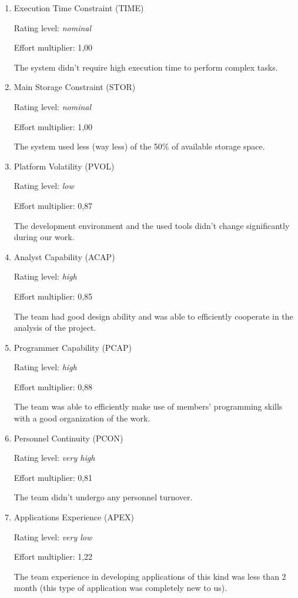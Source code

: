 \documentclass[10pt,a4paper,titlepage]{article}
\begin{document}
\begin{enumerate}
\item Execution Time Constraint (TIME)  

Rating level: \textit{nominal}

Effort multiplier: 1,00 
 
The system didn't require high execution time to perform complex tasks. 
 
\item Main Storage Constraint (STOR) 

Rating level: \textit{nominal}

Effort multiplier: 1,00 
 
The system used less (way less) of the 50\% of available storage space. 
 
\item Platform Volatility (PVOL)

Rating level: \textit{low}

Effort multiplier: 0,87 
 
The development environment and the used tools didn’t change significantly 
during our work. 
 
\item Analyst Capability (ACAP) 

Rating level: \textit{high}

Effort multiplier: 0,85 
 
The team had good design ability and was able to efficiently cooperate in the analysis of the project. 
 
\item Programmer Capability (PCAP) 

Rating level: \textit{high}

Effort multiplier: 0,88 
 
The team was able to efficiently make use of members' programming skills with a good organization of the work. 

\item Personnel Continuity (PCON) 

Rating level: \textit{very high}

Effort multiplier: 0,81 
 
The team didn't undergo any personnel turnover. 
 
\item Applications Experience (APEX) 

Rating level: \textit{very low}

Effort multiplier: 1,22 

The team experience in developing applications of this kind was less than 2 month (this type of application was completely new to us). 
 

\end{enumerate}
\end{document}

